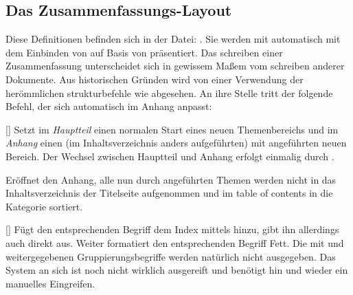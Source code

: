 %
%
%
%
%

\subsection{Das Zusammenfassungs-Layout}
Diese Definitionen befinden sich in der Datei: . Sie werden mit  automatisch mit dem Einbinden von  auf Basis von  präsentiert. \medskip\newline
Das schreiben einer Zusammenfassung unterscheidet sich in gewissem Maßem vom schreiben anderer Dokumente. Aus historischen Gründen wird von einer Verwendung der herömmlichen strukturbefehle wie  abgesehen. An ihre Stelle tritt der folgende Befehl, der sich automatisch im Anhang anpasst:

%
%
%

[]
Setzt im \emph{Hauptteil} einen normalen Start eines neuen Themenbereichs und im \emph{Anhang} einen (im Inhaltsverzeichnis anders aufgeführten) mit  angeführten neuen Bereich. Der Wechsel zwischen Hauptteil und Anhang erfolgt einmalig durch .

%
%
%

Eröffnet den Anhang, alle nun durch  angeführten Themen werden nicht in das Inhaltsverzeichnis der Titelseite aufgenommen und im table of contents in die Kategorie  sortiert.

%
%
%

[\cmdlist{}\cmdlist{}]
Fügt den entsprechenden Begriff dem Index mittels  hinzu, gibt ihn allerdings auch direkt aus. Weiter formatiert  den entsprechenden Begriff Fett. Die mit  und  weitergegebenen Gruppierungsbegriffe werden natürlich nicht ausgegeben. Das System an sich ist noch nicht wirklich ausgereift und benötigt hin und wieder ein manuelles Eingreifen.

%
%
%

